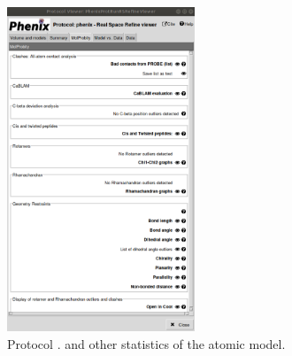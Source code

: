 \begin{itemize}
\begin{itemize}
\begin{figure}[H]
         \centering 
         \captionsetup{width=.9\linewidth} 
         \includegraphics[width=0.50\textwidth]{Images_appendix/Fig150.pdf}
         \caption{Protocol . \molprobity and other statistics of the atomic model.}
         \label{fig:app_protocol_real_space_refine_3}
        \end{figure}
        

\end{itemize}
\end{itemize}
